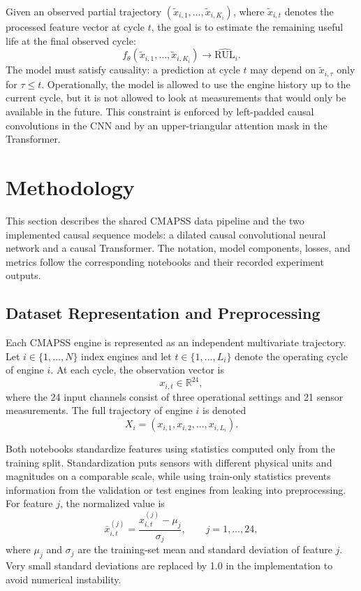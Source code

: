 \documentclass[11pt,a4paper]{article}
\begin{document}
Given an observed partial trajectory $(\tilde{x}_{i,1},\dots,\tilde{x}_{i,K_i})$, where $\tilde{x}_{i,t}$ denotes the processed feature vector at cycle $t$, the goal is to estimate the remaining useful life at the final observed cycle:
\begin{equation}
    f_\theta(\tilde{x}_{i,1},\dots,\tilde{x}_{i,K_i})
    \rightarrow
    \widehat{\mathrm{RUL}}_i.
\end{equation}
The model must satisfy causality: a prediction at cycle $t$ may depend on $\tilde{x}_{i,\tau}$ only for $\tau \leq t$. Operationally, the model is allowed to use the engine history up to the current cycle, but it is not allowed to look at measurements that would only be available in the future. This constraint is enforced by left-padded causal convolutions in the CNN and by an upper-triangular attention mask in the Transformer.

\newpage


\section{Methodology}

This section describes the shared CMAPSS data pipeline and the two implemented causal sequence models: a dilated causal convolutional neural network and a causal Transformer. The notation, model components, losses, and metrics follow the corresponding notebooks and their recorded experiment outputs.

\subsection{Dataset Representation and Preprocessing}

Each CMAPSS engine is represented as an independent multivariate trajectory. Let $i \in \{1,\dots,N\}$ index engines and let $t \in \{1,\dots,L_i\}$ denote the operating cycle of engine $i$. At each cycle, the observation vector is
\begin{equation}
    x_{i,t} \in \mathbb{R}^{24},
\end{equation}
where the 24 input channels consist of three operational settings and 21 sensor measurements. The full trajectory of engine $i$ is denoted
\begin{equation}
    X_i = (x_{i,1}, x_{i,2}, \dots, x_{i,L_i}).
\end{equation}

Both notebooks standardize features using statistics computed only from the training split. Standardization puts sensors with different physical units and magnitudes on a comparable scale, while using train-only statistics prevents information from the validation or test engines from leaking into preprocessing. For feature $j$, the normalized value is
\begin{equation}
    \bar{x}_{i,t}^{(j)}
    =
    \frac{x_{i,t}^{(j)} - \mu_j}{\sigma_j},
    \qquad j=1,\dots,24,
\end{equation}
where $\mu_j$ and $\sigma_j$ are the training-set mean and standard deviation of feature $j$. Very small standard deviations are replaced by 1.0 in the implementation to avoid numerical instability.
\end{document}
